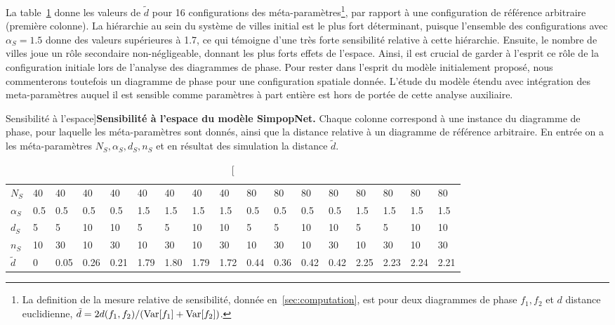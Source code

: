 La table~\ref{tab:macrocoevolexplo:spacematters} donne les valeurs de $\tilde{d}$ pour 16 configurations des méta-paramètres\footnote{La definition de la mesure relative de sensibilité, donnée en~\ref{sec:computation}, est pour deux diagrammes de phase $f_1,f_2$ et $d$ distance euclidienne, $\tilde{d} = 2 d(f_1,f_2)/(\operatorname{Var}\!\left[f_1\right]+\operatorname{Var}\!\left[f_2\right])$.}, par rapport à une configuration de référence arbitraire (première colonne). La hiérarchie au sein du système de villes initial est le plus fort déterminant, puisque l'ensemble des configurations avec $\alpha_S = 1.5$ donne des valeurs supérieures à 1.7, ce qui témoigne d'une très forte sensibilité relative à cette hiérarchie. Ensuite, le nombre de villes joue un rôle secondaire non-négligeable, donnant les plus forts effets de l'espace. Ainsi, il est crucial de garder à l'esprit ce rôle de la configuration initiale lors de l'analyse des diagrammes de phase. Pour rester dans l'esprit du modèle initialement proposé, nous commenterons toutefois un diagramme de phase pour une configuration spatiale donnée. L'étude du modèle étendu avec intégration des meta-paramètres auquel il est sensible comme paramètres à part entière est hors de portée de cette analyse auxiliaire. 


\begin{table}[!ht]
\caption[Sensibility to space][Sensibilité à l'espace]{}{\textbf{Sensibilité à l'espace du modèle SimpopNet.} Chaque colonne correspond à une instance du diagramme de phase, pour laquelle les méta-paramètres sont donnés, ainsi que la distance relative à un diagramme de référence arbitraire. En entrée on a les méta-paramètres $N_S,\alpha_S,d_S,n_S$ et en résultat des simulation la distance $\tilde{d}$.\label{tab:macrocoevolexplo:spacematters}}
\begin{tabular}{|l|l|l|l|l|l|l|l|l|l|l|l|l|l|l|l|l|}
\hline
$N_S$ & 40 & 40 & 40 & 40 & 40 & 40 & 40 & 40 & 80 & 80 & 80 & 80 & 80 & 80 & 80 & 80\\
$\alpha_S$ & 0.5 & 0.5 & 0.5 & 0.5 & 1.5 & 1.5 & 1.5 & 1.5 & 0.5 & 0.5 & 0.5 & 0.5 & 1.5 & 1.5 & 1.5 & 1.5\\
$d_S$ & 5 & 5 & 10 & 10 & 5 & 5 & 10 & 10 & 5 & 5 & 10 & 10 & 5 & 5 & 10 & 10\\
$n_S$ & 10 & 30 & 10 & 30 & 10 & 30 & 10 & 30 & 10 & 30 & 10 & 30 & 10 & 30 & 10 & 30\\\hline
$\tilde{d}$ & 0 & 0.05 & 0.26 & 0.21 & 1.79 & 1.80 & 1.79 & 1.72 & 0.44 & 0.36 & 0.42 & 0.42 & 2.25 & 2.23 & 2.24 & 2.21\\\hline
\end{tabular}
\end{table}



